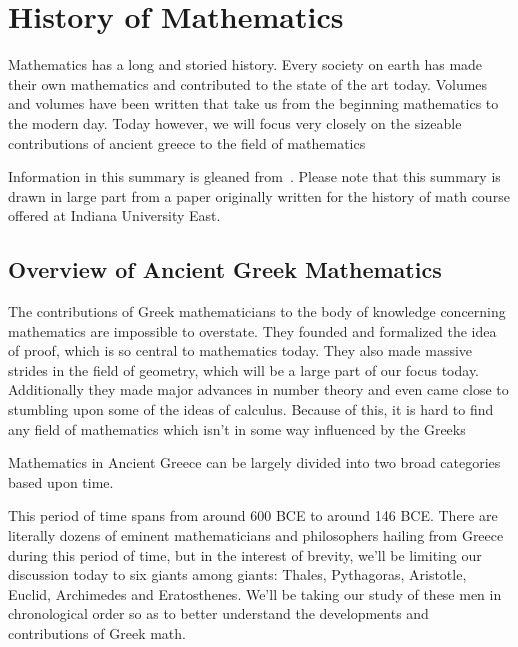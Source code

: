 \section{History of Mathematics}

Mathematics has a long and storied history. Every society on earth has made their own mathematics and contributed to the state of the art today. Volumes and volumes have been written that take us from the beginning mathematics to the modern day. Today however, we will focus very closely on the sizeable contributions of ancient greece to the field of mathematics\newline

Information in this summary is gleaned from~\cite{MathHistory}. Please note that this summary is drawn in large part from a paper originally written for the history of math course offered at Indiana University East.

\subsection{Overview of Ancient Greek Mathematics}

The contributions of Greek mathematicians
to the body of knowledge concerning mathematics are impossible to overstate. They founded and formalized the idea of proof, which is so central to mathematics today. They also made massive strides in the field of geometry, which
will be a large part of our focus today. Additionally they made major advances in number theory
and even came close to stumbling upon some of the ideas of calculus.
Because of this, it is hard to find any field of mathematics which isn’t in some way influenced by the Greeks\newline

Mathematics in Ancient Greece can be largely divided into two broad categories based upon time.\newline

This period of time spans from around 600 BCE to around 146 BCE.
There
are literally dozens of eminent
mathematicians and philosophers hailing from Greece during this
period of time, but in the interest of
brevity, we’ll be limiting our discussion today to six giants
among giants:
Thales, Pythagoras, Aristotle, Euclid, Archimedes and Eratosthenes.
We’ll be
taking our study of these men in chronological order so as to better understand the developments
and contributions of Greek math.

